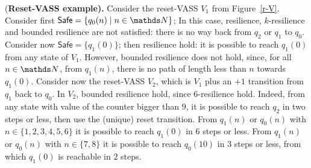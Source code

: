 \documentclass[runningheads]{llncs}
\newcommand{\alain}[1]{\todo[inline,color=red!20]{{\bf AF:} #1}}
\newcommand{\Safe}{\textsf{Safe}}
\begin{document}
\begin{example}\label{Example}
{(\bf Reset-VASS example).}
Consider the 
 reset-VASS $V_1$ from Figure~\ref{r-V}.
Consider first $\Safe = \{q_0(n) \mid n \in \N\}$; In this case,  {resilience}, 
{$k$-resilience} and {bounded resilience} are not satisfied: there is no  way back from $q_2$ or $q_1$ to $q_0$. Consider now $\Safe = \{q_1(0)\} $; then {resilience} hold: it is possible to reach $q_1(0)$ from any state of $V_1$. However, {bounded resilience} does not hold, since, for all $n\in \N$, from $q_1(n)$, there is no path of length less than $n$ towards $q_1(0)$. Consider now the 
 reset-VASS $V_2$, which is $V_1$ plus an $+1$ transition from $q_1$ back to $q_0$. In $V_2$, {bounded resilience} hold, since $6$-resilience hold. 
Indeed, from any state with value of the counter bigger than $9$, it is possible to reach $q_2$ in two steps or less, then use the (unique) reset transition. From $q_1(n)$ or $q_0(n)$ with $n \in \{1, 2, 3, 4, 5, 6\}$ it is possible to reach $q_1(0)$ in $6$ steps or less. From 
$q_1(n)$ or $q_0(n)$ with $n \in \{7,8\}$ it is possible to reach $q_0(10)$ in $3$ steps or less, from which $q_1(0)$ is reachable in $2$ steps. 
\end{example}

\fi
\end{document}
